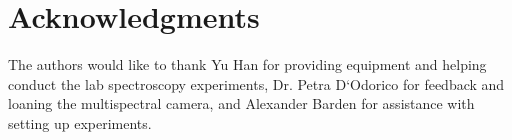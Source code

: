 \section*{Acknowledgments}

The authors would like to thank Yu Han for providing equipment and helping conduct the lab spectroscopy experiments, Dr. Petra D‘Odorico for feedback and loaning the multispectral camera, and Alexander Barden for assistance with setting up experiments.

